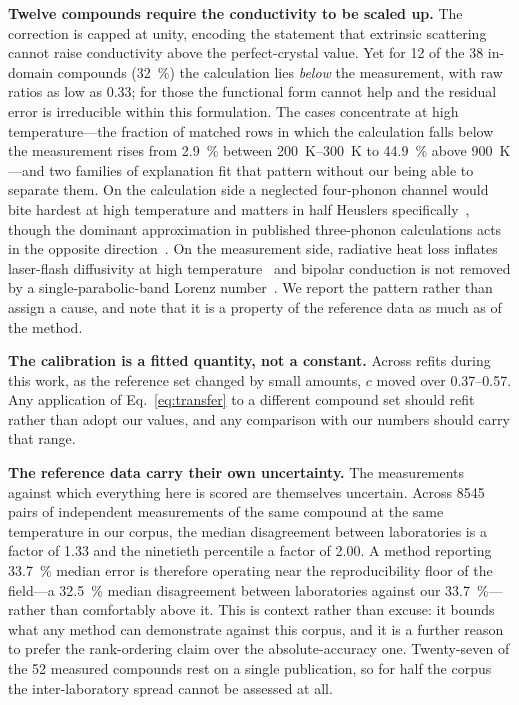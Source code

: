 \textbf{Twelve compounds require the conductivity to be scaled up.} The correction is capped at
unity, encoding the statement that extrinsic scattering cannot raise conductivity above the
perfect-crystal value. Yet for \num{12} of the \num{38} in-domain compounds (\SI{32}{\percent}) the
calculation lies \emph{below} the measurement, with raw ratios as low as \num{0.33}; for those the
functional form cannot help and the residual error is irreducible within this formulation. The cases
concentrate at high temperature---the fraction of matched rows in which the calculation falls below
the measurement rises from \SI{2.9}{\percent} between \SIrange{200}{300}{\kelvin} to
\SI{44.9}{\percent} above \SI{900}{\kelvin}---and two families of explanation fit that pattern
without our being able to separate them. On the calculation side a neglected four-phonon channel
would bite hardest at high temperature and matters in half Heuslers
specifically~\cite{li2024multiphono}, though the dominant approximation in published three-phonon
calculations acts in the opposite direction~\cite{feng2017fourphonon}. On the measurement side,
radiative heat loss inflates laser-flash diffusivity at high temperature~\cite{nishi2020effect} and
bipolar conduction is not removed by a single-parabolic-band Lorenz number~\cite{kim2015characteri}.
We report the pattern rather than assign a cause, and note that it is a property of the reference
data as much as of the method.

\textbf{The calibration is a fitted quantity, not a constant.} Across refits during this work, as
the reference set changed by small amounts, $c$ moved over \numrange{0.37}{0.57}. Any application of
Eq.~\eqref{eq:transfer} to a different compound set should refit rather than adopt our values, and
any comparison with our numbers should carry that range.

\textbf{The reference data carry their own uncertainty.} The measurements against which everything
here is scored are themselves uncertain. Across \num{8545} pairs of independent measurements of the
same compound at the same temperature in our corpus, the median disagreement between laboratories is
a factor of \num{1.33} and the ninetieth percentile a factor of \num{2.00}. A method reporting
\SI{33.7}{\percent} median error is therefore operating near the reproducibility floor of the
field---a \SI{32.5}{\percent} median disagreement between laboratories against our
\SI{33.7}{\percent}---rather than comfortably above it. This is context rather than excuse: it bounds
what any method can demonstrate against this corpus, and it is a further reason to prefer the
rank-ordering claim over the absolute-accuracy one. Twenty-seven of the \num{52} measured compounds
rest on a single publication, so for half the corpus the inter-laboratory spread cannot be assessed
at all.
